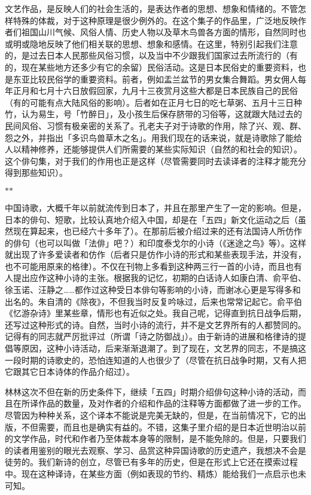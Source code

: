 {    文艺作品，是反映人们的社会生活的，是表达作者的思想、想象和情绪的。不管怎样特殊的体裁，对于这种原理是很少例外的。在这个集子的作品里，广泛地反映作者们祖国山川气候、风俗人情、历史人物以及草木鸟兽各方面的情形，自然同时也或明或隐地反映了他们相关联的思想、想象和感情。在这里，特别引起我们注意的，是过去日本人民那些风俗习惯，以及当中不少跟我们国家过去所流行的（有的，现在某些地方还多少有它的余留）民俗活动。这是日本民俗史的重要资料，也是东亚比较民俗学的重要资料。前者，例如盂兰盆节的男女集合舞蹈。男女佣人每年正月和七月十六日放假回家，九月十三夜赏月这些大都是日本民族自己的民俗（有的可能有点大陆风俗的影响）。后者如在正月七日的吃七草粥、五月十三日种竹，认为易生，号「竹醉日」，及小孩生后保存脐带的习俗等，这就跟大陆过去的民间风俗、习惯有极亲密的关系了。孔老夫子对于诗歌的作用，除了兴、观、群、怨之外，并指出「多识鸟兽草木之名」。用我们现在的话来说，就是诗歌除了能给人以精神修养，还能够提供人们所需要的某些实际知识（自然的和社会的知识）。这个俳句集，对于我们的作用也正是这样（尽管需要同时去读译者的注释才能充分得到那些知识）。

    \centerline{\hfill$*$\hfill$*$\hfill}

    中国诗歌，大概千年以前就流传到日本了，并且在那里产生了一定的影响。但是，日本的俳句、短歌，比较认真地介绍入中国，却是在「五四」新文化运动之后（虽然现在算起来，也已经六十多年了）。在那前后被介绍过来的还有法国诗人所仿作的俳句（也可以叫做「法俳」吧？）和印度泰戈尔的小诗（《迷途之鸟》等）。这样就出现了许多爱读者和仿作（后者只是仿作小诗的形式和某些表现手法，并没有，也不可能用原来的格律）。不仅在刊物上多看到这种两三行一首的小诗，而且也有人提出应作这种小诗的主张。根据我的记忆，初期的白话诗人如康白清、俞平伯、徐玉诺、汪静之……都作过这种受日本俳句等影响的小诗，而谢冰心更是写得多和出名的。朱自清的《除夜》，不但我当时反复吟咏过，后来也常常记起它。俞平伯《忆游杂诗》里某些章，情形也有近似之处。我自己呢，记得直到抗日战争后期，还写过这种形式的诗。自然，当时小诗的流行，并不是文艺界所有的人都赞同的。记得有的同志就严厉批评过（所谓「诗之防御战」）。由于新诗的进展和格律诗的提倡等原因，这种小诗活动，后来渐渐退潮了。到了现在，文艺界的同志，不是搞这一段时期的诗歌史的，恐怕连知道的人也很少了（尽管在抗日战争时期，又有人把它跟其它日本诗体的作品介绍过）。

    林林这次不但在新的历史条件下，继续「五四」时期介绍俳句这种小诗的活动，而且在所译作品的数量，及对作者的介绍和作品的注释等方面都做了进一步的工作。尽管因为种种关系，这个译本不能说是完美无缺的，但是，在当前情况下，它的出版，不但需要，而且也是确实有益的。不错，这集子里介绍的是日本近世明治以前的文学作品，时代和作者乃至体裁本身等的限制，是不能免除的。但是，只要我们的读者用鉴别的眼光去观察、学习、品赏这种异国诗歌的历史遗产，我想决不会是徒劳的。我们新诗的创立，尽管已有多年的历史，但是在形式上它还在摸索过程中。现在这种译诗，在某些方面（例如表现的节约、精炼）能给我们一点启示也未可知。

}
